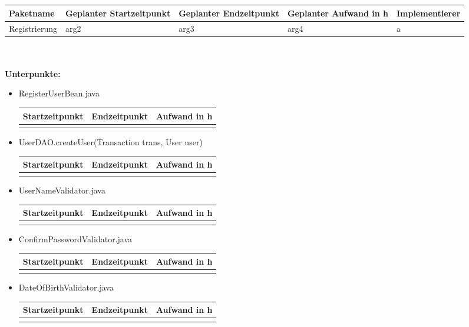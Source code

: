\documentclass[12pt,a4paper]{scrreprt}
\newcommand{\Arbeitspaket}[5]{	\begin{tabular}{|p{4cm}|p{3cm}|p{3cm}|p{3cm}|p{3cm}|}
		\hline \textbf{Paketname} & \textbf{Geplanter Startzeitpunkt} & \textbf{Geplanter Endzeitpunkt} & \textbf{Geplanter Aufwand in h} & \textbf{Implementierer} \\ 
		\hline #1 & #2  & #3 & #4 & #5 \\ 
		\hline 
	\end{tabular} \ \\
	\ \\}
\begin{document}
	\ \\
	\ \\
	\Arbeitspaket{Registrierung}{arg2}{arg3}{arg4}{a}
	\textbf{Unterpunkte:}
	\begin{itemize}
		\item RegisterUserBean.java	\\
		\begin{tabular}{|p{4cm}|p{4cm}|p{4cm}|}
			\hline Startzeitpunkt & Endzeitpunkt & Aufwand in h \\ 
			\hline &      &  \\ 
			\hline 
		\end{tabular}
		\item UserDAO.createUser(Transaction trans, User user)\\
		\begin{tabular}{|p{4cm}|p{4cm}|p{4cm}|}
			\hline Startzeitpunkt & Endzeitpunkt & Aufwand in h \\ 
			\hline &      &  \\ 
			\hline 
		\end{tabular}
		\item UserNameValidator.java\\
		\begin{tabular}{|p{4cm}|p{4cm}|p{4cm}|}
			\hline Startzeitpunkt & Endzeitpunkt & Aufwand in h \\ 
			\hline &      &  \\ 
			\hline 
		\end{tabular}
		\item ConfirmPasswordValidator.java\\
		\begin{tabular}{|p{4cm}|p{4cm}|p{4cm}|}
			\hline Startzeitpunkt & Endzeitpunkt & Aufwand in h \\ 
			\hline &      &  \\ 
			\hline 
		\end{tabular}
		\item DateOfBirthValidator.java\\
		\begin{tabular}{|p{4cm}|p{4cm}|p{4cm}|}
			\hline Startzeitpunkt & Endzeitpunkt & Aufwand in h \\ 
			\hline &      &  \\ 
			\hline 
		\end{tabular}
	\end{itemize}
	
\end{document}
